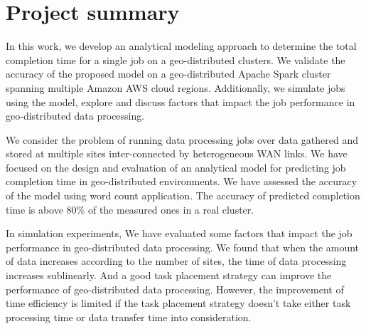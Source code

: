 \documentclass[base.tex]{subfiles}
\begin{document}
\section{Project summary}
In this work, we develop an analytical modeling approach to determine the total completion time for a single job on a geo-distributed clusters. We validate the accuracy of the proposed model on a geo-distributed Apache Spark cluster spanning multiple Amazon AWS cloud regions. Additionally, we simulate jobs using the model, explore and discuss factors that impact the job performance in geo-distributed data processing.

We consider the problem of running data processing jobs over data gathered and stored at multiple sites inter-connected by heterogeneous WAN links. We have focused on the design and evaluation of an analytical model for predicting job completion time in geo-distributed environments. We have assessed the accuracy of the model using word count application. The accuracy of predicted completion time is above 80\% of the measured ones in a real cluster.

In simulation experiments, We have evaluated some factors that impact the job performance in geo-distributed data processing. We found that when the amount of data increases according to the number of sites, the time of data processing increases sublinearly. And a good task placement strategy can improve the performance of geo-distributed data processing. However, the improvement of time efficiency is limited if the task placement strategy doesn't take either task processing time or data transfer time into consideration.
\end{document}
